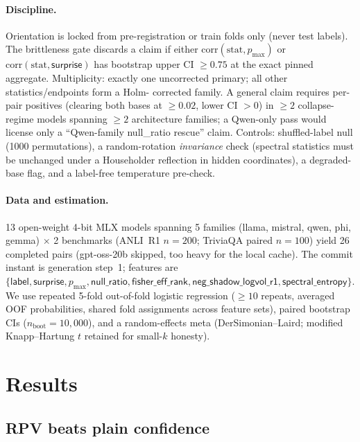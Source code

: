 \documentclass[10pt, letterpaper]{article}
\newcommand{\pmax}{p_{\max}}
\newcommand{\effrank}{\textsf{fisher\_eff\_rank}}
\newcommand{\spent}{\textsf{spectral\_entropy}}
\newcommand{\nullr}{\textsf{null\_ratio}}
\begin{document}
\paragraph{Discipline.}
Orientation is locked from pre-registration or train folds only (never
test labels). The brittleness gate discards a claim if either
$\mathrm{corr}(\text{stat},\pmax)$ or
$\mathrm{corr}(\text{stat},\textsf{surprise})$ has bootstrap upper CI
$\ge 0.75$ at the exact pinned aggregate. Multiplicity: exactly one
uncorrected primary; all other statistics/endpoints form a Holm-
corrected family. A general claim requires per-pair positives (clearing
both bases at $\ge 0.02$, lower CI $>0$) in $\ge 2$ collapse-regime
models spanning $\ge 2$ architecture families; a Qwen-only pass would
license only a ``Qwen-family \nullr{} rescue'' claim. Controls:
shuffled-label null (1000 permutations), a random-rotation
\emph{invariance} check (spectral statistics must be unchanged under a
Householder reflection in hidden coordinates), a degraded-base flag,
and a label-free temperature pre-check.

\paragraph{Data and estimation.}
13 open-weight 4-bit MLX models \citep{mlxframework} spanning 5
families (llama, mistral, qwen, phi, gemma) $\times$ 2 benchmarks (ANLI~R1
$n{=}200$; TriviaQA paired $n{=}100$) yield 26 completed pairs
(gpt-oss-20b skipped, too heavy for the local cache). The commit instant
is generation step~1; features are
$\{\textsf{label},\textsf{surprise},\pmax,\nullr{},\effrank{},
\textsf{neg\_shadow\_logvol\_r1},\spent{}\}$. We use repeated 5-fold
out-of-fold logistic regression ($\ge 10$ repeats, averaged OOF
probabilities, shared fold assignments across feature sets), paired
bootstrap CIs ($n_{\text{boot}}{=}10{,}000$), and a random-effects meta
(DerSimonian--Laird; modified Knapp--Hartung $t$ retained for small-$k$
honesty).

\section{Results}
\label{sec:results}

\subsection{RPV beats plain confidence}
\label{sec:results-conf}
\end{document}
